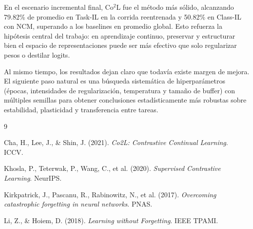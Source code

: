\documentclass[10pt,a4paper]{article}
\begin{document}
En el escenario incremental final, Co$^2$L fue el método más sólido, alcanzando 79.82\% de promedio en Task-IL en la corrida reentrenada y 50.82\% en Class-IL con NCM, superando a los baselines en promedio global. Esto refuerza la hipótesis central del trabajo: en aprendizaje continuo, preservar y estructurar bien el espacio de representaciones puede ser más efectivo que solo regularizar pesos o destilar logits.

Al mismo tiempo, los resultados dejan claro que todavía existe margen de mejora. El siguiente paso natural es una búsqueda sistemática de hiperparámetros (épocas, intensidades de regularización, temperatura y tamaño de buffer) con múltiples semillas para obtener conclusiones estadísticamente más robustas sobre estabilidad, plasticidad y transferencia entre tareas.


\begin{thebibliography}{9}

Cha, H., Lee, J., \& Shin, J. (2021).
\textit{Co2L: Contrastive Continual Learning}.
ICCV.

Khosla, P., Teterwak, P., Wang, C., et al. (2020).
\textit{Supervised Contrastive Learning}.
NeurIPS.

Kirkpatrick, J., Pascanu, R., Rabinowitz, N., et al. (2017).
\textit{Overcoming catastrophic forgetting in neural networks}.
PNAS.

Li, Z., \& Hoiem, D. (2018).
\textit{Learning without Forgetting}.
IEEE TPAMI.

\end{thebibliography}
\end{document}
